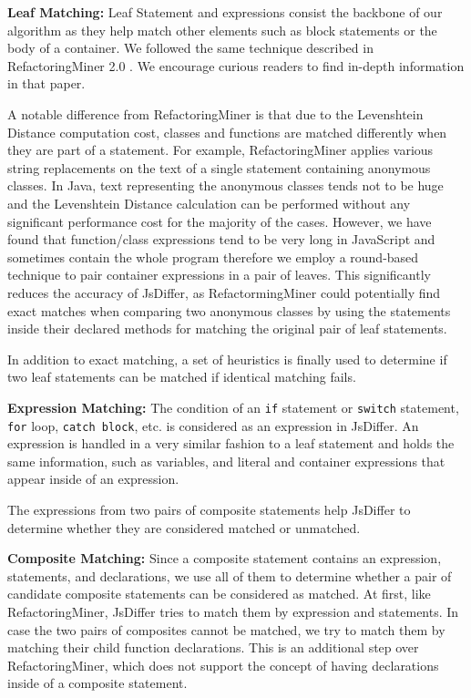 \documentclass[letterpaper,12pt,onecolumn,final]{report}
\begin{document}
\textbf{Leaf Matching:} Leaf Statement and expressions consist the backbone of our algorithm as they help match other elements such as block statements or the body of a container. We followed the same technique described in RefactoringMiner 2.0 \cite{Tsantalis2020}. We encourage curious readers to find in-depth information in that paper.

A notable difference from RefactoringMiner is that due to the Levenshtein Distance computation cost, classes and functions are matched differently when they are part of a statement. For example, RefactoringMiner applies various string replacements on the text of a single statement containing anonymous classes. In Java, text representing the anonymous classes tends not to be huge and the Levenshtein Distance calculation can be performed without any significant performance cost for the majority of the cases. However, we have found that function/class expressions tend to be very long in JavaScript and sometimes contain the whole program therefore we employ a round-based technique to pair container expressions in a pair of leaves. This significantly reduces the accuracy of JsDiffer, as RefactormingMiner could potentially find exact matches when comparing two anonymous classes by using the statements inside their declared methods for matching the original pair of leaf statements.

In addition to exact matching, a set of heuristics is finally used to determine if two leaf statements can be matched if identical matching fails.

\textbf{Expression Matching:} The condition of an \texttt{if} statement or \texttt{switch} statement, \texttt{for} loop, \texttt{catch block}, etc. is considered as an expression in JsDiffer. An expression is handled in a very similar fashion to a leaf statement and holds the same information, such as variables, and literal and container expressions that appear inside of an expression.

The expressions from two pairs of composite statements help JsDiffer to determine whether they are considered matched or unmatched.

\textbf{Composite Matching:} Since a composite statement contains an expression, statements, and declarations, we use all of them to determine whether a pair of candidate composite statements can be considered as matched. At first, like RefactoringMiner, JsDiffer tries to match them by expression and statements. In case the two pairs of composites cannot be matched, we try to match them by matching their child function declarations. This is an additional step over RefactoringMiner, which does not support the concept of having declarations inside of a composite statement.
\end{document}
